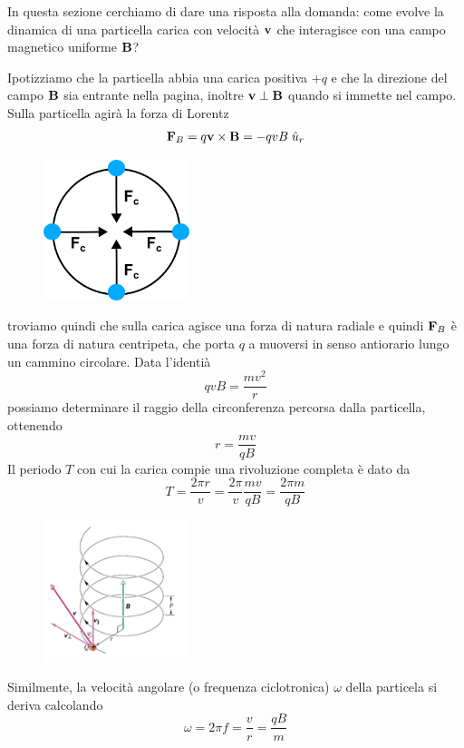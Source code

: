 In questa sezione cerchiamo di dare una risposta alla domanda: come evolve la dinamica di una particella carica con velocit\`a $\bold{v}$ che interagisce con una campo magnetico uniforme $\bold{B}$?

Ipotizziamo che la particella abbia una carica positiva $+q$ e che la direzione del campo $\bold{B}$ sia entrante nella pagina, inoltre $\bold{v} \perp \bold{B}$ quando si immette nel campo. Sulla particella agir\`a la forza di Lorentz 
\begin{equation}
	\bold{F}_{B} = q\bold{v} \times \bold{B} = -qvB \;\hat{u}_{r}
\end{equation}
\begin{figure} %
    \centering
    \includegraphics[width=0.38\textwidth]{images/centripede} %
\end{figure}
troviamo quindi che sulla carica agisce una forza di natura radiale e quindi $\bold{F}_{B}$ \`e una forza di natura centripeta, che porta $q$ a muoversi in senso antiorario lungo un cammino circolare.
Data l'identi\`a 
\begin{equation*}
	qvB = \frac{mv^2}{r}
\end{equation*}
possiamo determinare il raggio della circonferenza percorsa dalla particella, ottenendo
\begin{equation*}
	r = \frac{mv}{qB}
\end{equation*}
Il periodo $T$ con cui la carica compie una rivoluzione completa \`e dato da 
\begin{equation*}
	T = \frac{2 \pi r}{v} = \frac{2\pi}{v} \frac{mv}{qB} = \frac{2\pi m}{qB}
\end{equation*}
\begin{figure} %
    \centering
    \includegraphics[width=0.38\textwidth]{images/spiral} %
\end{figure}
Similmente, la velocit\`a angolare (o frequenza ciclotronica) $\omega$ della particela si deriva calcolando
\begin{equation*}
	\omega = 2 \pi f = \frac{v}{r} = \frac{qB}{m}
\end{equation*}

